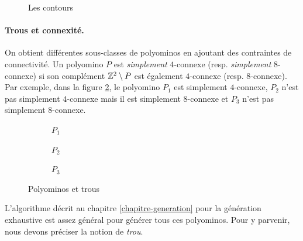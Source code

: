 \begin{figure}
\centering
\shorthandoff{:}
\caption{Les contours}\label{fig:contours}
\end{figure}


\paragraph{\bf Trous et connexité.}\medskip
On obtient différentes sous-classes de polyominos en ajoutant des contraintes de connectivité. Un polyomino $P$ est \emph{simplement} $4$-connexe (resp. \emph{simplement} $8$-connexe) si son complément $\mathbb{Z}^2 \setminus P$ est également $4$-connexe (resp. $8$-connexe). Par exemple, dans la figure \ref{fig:trous}, le polyomino $P_1$ est simplement $4$-connexe, $P_2$ n'est pas simplement $4$-connexe mais il est simplement $8$-connexe et $P_3$ n'est pas simplement $8$-connexe.
\begin{figure}[h]
\centering
\begin{subfigure}[b]{.2\linewidth}
\centering
{}
\caption*{$P_1$}
\end{subfigure}
\begin{subfigure}[b]{.2\linewidth}
\centering
{}
\caption*{$P_2$}
\end{subfigure}
\begin{subfigure}[b]{.2\linewidth}
\centering
{}
\caption*{$P_3$}
\end{subfigure}
\vspace{-12pt}\caption{Polyominos et trous}
\label{fig:trous}
\end{figure}
\vspace{-12pt}
L'algorithme décrit au chapitre \ref{chapitre-generation} pour la génération exhaustive est assez général pour générer tous ces polyominos. Pour y parvenir, nous devons préciser la notion de \emph{trou}.

